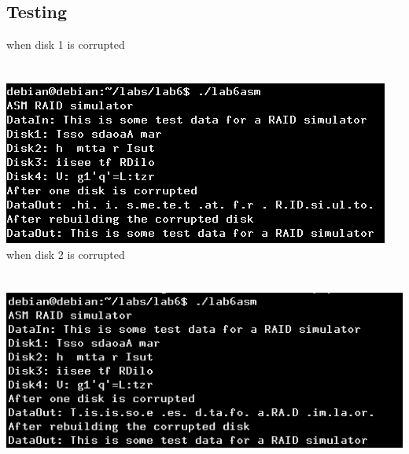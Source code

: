 \documentclass{article}
\begin{document}
\subsection{Testing}
\begin{multicols}{2}
when disk 1 is corrupted \\ \\ \\ 
\includegraphics[scale=.5]{lab6asm1.png}
\columnbreak
\\ when disk 2 is corrupted \\ \\ \\ 
\includegraphics[scale=.5]{lab6asm2.png}
\end{multicols}
\clearpage
\end{document}
